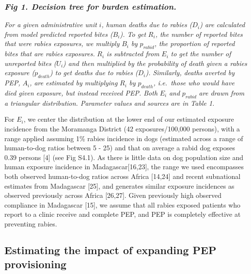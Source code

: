\documentclass[
]{book}
\begin{document}
\hypertarget{fig-1.-decision-tree-for-burden-estimation.}{%
\subsubsection{\texorpdfstring{\emph{Fig 1. Decision tree for burden estimation.}}{Fig 1. Decision tree for burden estimation.}}\label{fig-1.-decision-tree-for-burden-estimation.}}

\emph{For a given administrative unit} \(i\)\emph{, human deaths due to rabies
(}\(D_{i}\)\emph{) are calculated from model predicted reported bites
(}\(B_{i}\)\emph{). To get} \(R_{i}\)\emph{, the number of reported bites that were
rabies exposures, we multiply} \(B_{i}\) \emph{by} \(p_{rabid}\)\emph{, the proportion
of reported bites that are rabies exposures.} \(R_{i}\) \emph{is subtracted
from} \(E_{i}\) \emph{to get the number of unreported bites (}\(U_{i}\)\emph{) and
then multiplied by the probability of death given a rabies exposure
(}\(p_{death}\)\emph{) to get deaths due to rabies (}\(D_{i}\)\emph{). Similarly,
deaths averted by PEP,} \(A_{i}\)\emph{, are estimated by multiplying} \(R_{i}\)
\emph{by} \(p_{death}\)\emph{, i.e.~those who would have died given exposure, but
instead received PEP. Both} \(E_{i}\) \emph{and} \(p_{rabid}\) \emph{are drawn from a
triangular distribution. Parameter values and sources are in Table 1.}

For \(E_{i}\), we center the distribution at the lower end of our
estimated exposure incidence from the Moramanga District (42
exposures/100,000 persons), with a range applied assuming 1\% rabies
incidence in dogs (estimated across a range of human-to-dog ratios
between 5 - 25) and that on average a rabid dog exposes 0.39 persons
{[}4{]} (see Fig S4.1). As there is little data on dog population size and
human exposure incidence in Madagascar{[}16,23{]}, the range we used
encompasses both observed human-to-dog ratios across Africa {[}14,24{]}
and recent subnational estimates from Madagascar {[}25{]}, and generates
similar exposure incidences as observed previously across Africa
{[}26,27{]}. Given previously high observed compliance in Madagascar
{[}15{]}, we assume that all rabies exposed patients who report to a
clinic receive and complete PEP, and PEP is completely effective at
preventing rabies.

\hypertarget{estimating-the-impact-of-expanding-pep-provisioning}{%
\subsection{Estimating the impact of expanding PEP provisioning}\label{estimating-the-impact-of-expanding-pep-provisioning}}
\end{document}
